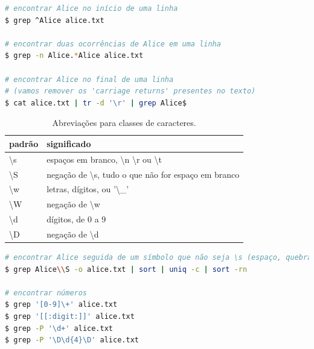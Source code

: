 \begin{frame}
\begin{lstlisting}[language=bash, label=lst-grep-03, caption={}, postbreak=\mbox{$\hookrightarrow$\space}, basicstyle=\fontsize{8}{10}\selectfont\ttfamily]
# encontrar Alice no início de uma linha                                             
$ grep ^Alice alice.txt

# encontrar duas ocorrências de Alice em uma linha
$ grep -n Alice.*Alice alice.txt       

# encontrar Alice no final de uma linha
# (vamos remover os 'carriage returns' presentes no texto)
$ cat alice.txt | tr -d '\r' | grep Alice$
\end{lstlisting}

\framebreak

\begin{table}
\caption{Abreviações para classes de caracteres.}\label{tab-regex-charpat}
\begin{tabular}{ll}
padrão & significado \\
\midrule
\textbackslash s  &    espaços em branco, \textbackslash n \textbackslash r ou \textbackslash t \\                   
\textbackslash S  &    negação de \textbackslash s, tudo o que não for espaço em branco \\
\textbackslash w  &    letras, dígitos, ou '\textbackslash\_'         \\
\textbackslash W  &    negação de \textbackslash w                    \\
\textbackslash d  &    dígitos, de 0 a 9                 \\
\textbackslash D  &    negação de \textbackslash d                    \\
\end{tabular}
\end{table}

\framebreak

\begin{lstlisting}[language=bash, label=lst-grep-04, caption={Abreviações para classes de caracteres.}, postbreak=\mbox{$\hookrightarrow$\space}, basicstyle=\fontsize{8}{10}\selectfont\ttfamily]
# encontrar Alice seguida de um símbolo que não seja \s (espaço, quebra de linha ou tabulação), ao final contabilizar os padrões presentes
$ grep Alice\\S -o alice.txt | sort | uniq -c | sort -rn

# encontrar números
$ grep '[0-9]\+' alice.txt
$ grep '[[:digit:]]' alice.txt
$ grep -P '\d+' alice.txt
$ grep -P '\D\d{4}\D' alice.txt


\end{lstlisting}
\end{frame}
